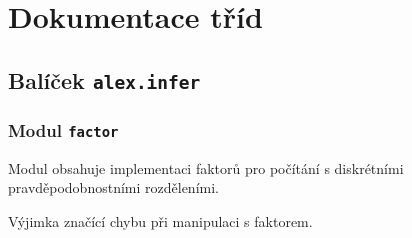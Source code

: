 
\chapter{Dokumentace tříd}
\label{ap:doc}

\section{Balíček \texttt{alex.infer}}
\label{alex.infer::doc}\label{alex.infer:balicek-infer}

\subsection{Modul \texttt{factor}}
\label{alex.infer:modul-factor}\label{alex.infer:module-alex.infer.factor}
Modul {\hyperref[alex.infer:module-alex.infer.factor]{}} obsahuje implementaci faktorů pro počítání s
diskrétními pravděpodobnostními rozděleními.

\begin{fulllineitems}
\label{alex.infer:alex.infer.factor.FactorError}
Výjimka značící chybu při manipulaci s faktorem.

\end{fulllineitems}


